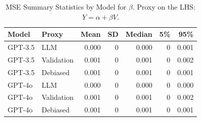 \begin{table}

\caption{MSE Summary Statistics by Model for $\beta$. Proxy on the LHS: $Y = \alpha + \beta V$.}
\centering
\begin{tabular}[t]{llrrrrr}
\toprule
Model & Proxy & Mean & SD & Median & 5\% & 95\%\\
\midrule
GPT-3.5 & LLM & 0.000 & 0 & 0.000 & 0 & 0.001\\
GPT-3.5 & Validation & 0.001 & 0 & 0.001 & 0 & 0.002\\
GPT-3.5 & Debiased & 0.001 & 0 & 0.001 & 0 & 0.001\\
GPT-4o & LLM & 0.000 & 0 & 0.000 & 0 & 0.000\\
GPT-4o & Validation & 0.001 & 0 & 0.001 & 0 & 0.002\\
GPT-4o & Debiased & 0.001 & 0 & 0.001 & 0 & 0.001\\
\bottomrule
\end{tabular}
\end{table}
